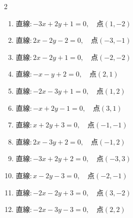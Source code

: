 \begin{multicols}{2}
\begin{enumerate}
  \item $直線:-3x+2y+1=0,\quad 点 ( 1, -2 )$


  \item $直線:2x-2y-2=0,\quad 点 ( -3, -1 )$


  \item $直線:2x-2y+1=0,\quad 点 ( -2, -2 )$


  \item $直線:-x-y+2=0,\quad 点 ( 2, 1 )$


  \item $直線:-2x-3y+1=0,\quad 点 ( 1, 2 )$


  \item $直線:-x+2y-1=0,\quad 点 ( 3, 1 )$


  \item $直線:x+2y+3=0,\quad 点 ( -1, -1 )$

        \phantom{$\displaystyle 距離 : 0$}

  \item $直線:2x-3y+2=0,\quad 点 ( -1, 2 )$


  \item $直線:-3x+2y+2=0,\quad 点 ( -3, 3 )$


\columnbreak %

  \item $直線:x-2y-3=0,\quad 点 ( -2, -1 )$


  \item $直線:-2x-2y+3=0,\quad 点 ( 3, -2 )$


  \item $直線:-2x-3y-3=0,\quad 点 ( 2, 2 )$


\end{enumerate}
\end{multicols}
